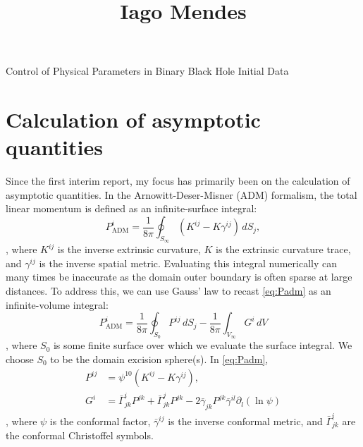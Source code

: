 \documentclass{../document}
\begin{document}
	\title
		[Caltech SURF Second Interim Report]
		{Iago Mendes}
		{Control of Physical Parameters in Binary Black Hole Initial Data}
  
  \section{Calculation of asymptotic quantities}
    Since the first interim report, my focus has primarily been on the calculation of asymptotic quantities. In the Arnowitt-Deser-Misner (ADM) formalism, the total linear momentum is defined as an infinite-surface integral:
    \begin{equation} \label{eq:Padm}
      P_\text{ADM}^i = \frac{1}{8\pi} \oint_{S_\infty} (K^{ij} - K \gamma^{ij}) \, dS_j,
    \end{equation}
    \cite{Serguei}, where $K^{ij}$ is the inverse extrinsic curvature, $K$ is the extrinsic curvature trace, and $\gamma^{ij}$ is the inverse spatial metric. Evaluating this integral numerically can many times be inaccurate as the domain outer boundary is often sparse at large distances. To address this, we can use Gauss' law to recast \eqref{eq:Padm} as an infinite-volume integral:
    \begin{equation} \label{eq:Padm-volume}
      P_\text{ADM}^i = \frac{1}{8\pi} \oint_{S_0} P^{ij} \, dS_j - \frac{1}{8\pi} \int_{V_\infty} G^i \, dV
    \end{equation}
    \cite{Serguei}, where $S_0$ is some finite surface over which we evaluate the surface integral. We choose $S_0$ to be the domain excision sphere(s). In \eqref{eq:Padm},
    \begin{align}
      P^{ij} &= \psi^{10} (K^{ij} - K \gamma^{ij}), \\
      G^{i} &= \bar\Gamma^i_{jk} P^{jk}
             + \bar\Gamma^j_{jk} P^{jk}
             - 2 \bar\gamma_{jk} P^{jk} \bar\gamma^{il} \partial_l(\ln\psi)
    \end{align}
    \cite{Serguei}, where $\psi$ is the conformal factor, $\bar\gamma^{ij}$ is the inverse conformal metric, and $\bar\Gamma^i_{jk}$ are the conformal Christoffel symbols.
\end{document}

